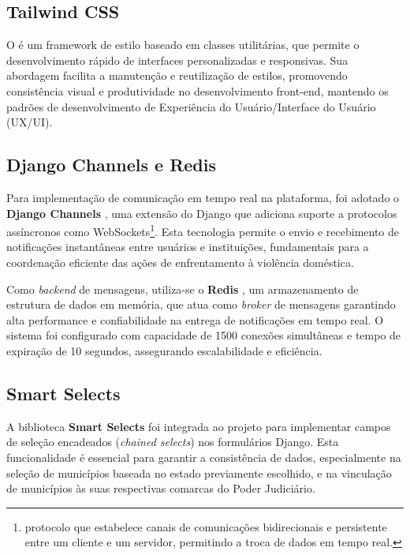 \subsection{Tailwind CSS}
\par O  é um framework de estilo baseado em classes utilitárias, que permite o desenvolvimento rápido de interfaces personalizadas e responsivas. Sua abordagem facilita a manutenção e reutilização de estilos, promovendo consistência visual e produtividade no desenvolvimento front-end, mantendo os padrões de desenvolvimento de Experiência do Usuário/Interface do Usuário (UX/UI).

\subsection{Django Channels e Redis}
\par Para implementação de comunicação em tempo real na plataforma, foi adotado o \textbf{Django Channels} \cite{django_channels:2025}, uma extensão do Django que adiciona suporte a protocolos assíncronos como WebSockets\footnote{protocolo que estabelece canais de comunicações bidirecionais e persistente entre um cliente e um servidor, permitindo a troca de dados em tempo real.}. Esta tecnologia permite o envio e recebimento de notificações instantâneas entre usuários e instituições, fundamentais para a coordenação eficiente das ações de enfrentamento à violência doméstica.
\par Como \textit{backend} de mensagens, utiliza-se o \textbf{Redis} \cite{redis:2025}, um armazenamento de estrutura de dados em memória, que atua como \textit{broker} de mensagens garantindo alta performance e confiabilidade na entrega de notificações em tempo real. O sistema foi configurado com capacidade de 1500 conexões simultâneas e tempo de expiração de 10 segundos, assegurando escalabilidade e eficiência.

\subsection{Smart Selects}
\par A biblioteca \textbf{Smart Selects} \cite{smart_selects:2025} foi integrada ao projeto para implementar campos de seleção encadeados (\textit{chained selects}) nos formulários Django. Esta funcionalidade é essencial para garantir a consistência de dados, especialmente na seleção de municípios baseada no estado previamente escolhido, e na vinculação de municípios às suas respectivas comarcas do Poder Judiciário.

